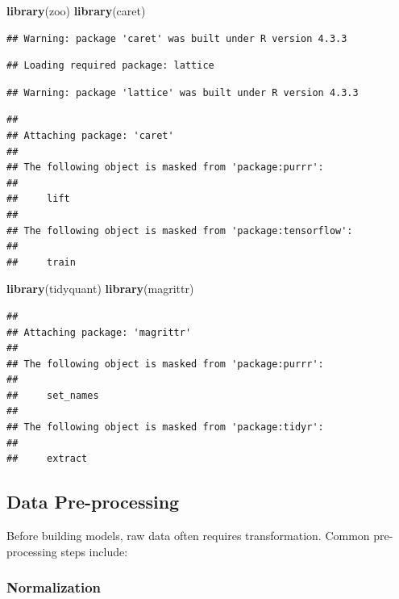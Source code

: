 \documentclass[
]{article}
\newenvironment{Shaded}{\begin{snugshade}}{\end{snugshade}}
\newcommand{\FunctionTok}[1]{\textcolor[rgb]{0.13,0.29,0.53}{\textbf{#1}}}
\newcommand{\NormalTok}[1]{#1}
\begin{document}
\begin{Shaded}
\begin{Highlighting}[]
\FunctionTok{library}\NormalTok{(zoo)}
\FunctionTok{library}\NormalTok{(caret)}
\end{Highlighting}
\end{Shaded}

\begin{verbatim}
## Warning: package 'caret' was built under R version 4.3.3
\end{verbatim}

\begin{verbatim}
## Loading required package: lattice
\end{verbatim}

\begin{verbatim}
## Warning: package 'lattice' was built under R version 4.3.3
\end{verbatim}

\begin{verbatim}
## 
## Attaching package: 'caret'
## 
## The following object is masked from 'package:purrr':
## 
##     lift
## 
## The following object is masked from 'package:tensorflow':
## 
##     train
\end{verbatim}

\begin{Shaded}
\begin{Highlighting}[]
\FunctionTok{library}\NormalTok{(tidyquant)}
\FunctionTok{library}\NormalTok{(magrittr)}
\end{Highlighting}
\end{Shaded}

\begin{verbatim}
## 
## Attaching package: 'magrittr'
## 
## The following object is masked from 'package:purrr':
## 
##     set_names
## 
## The following object is masked from 'package:tidyr':
## 
##     extract
\end{verbatim}

\subsection{Data Pre-processing}\label{data-pre-processing}

Before building models, raw data often requires transformation. Common
pre-processing steps include:

\subsubsection{\texorpdfstring{\textbf{Normalization}}{Normalization}}\label{normalization}
\end{document}
